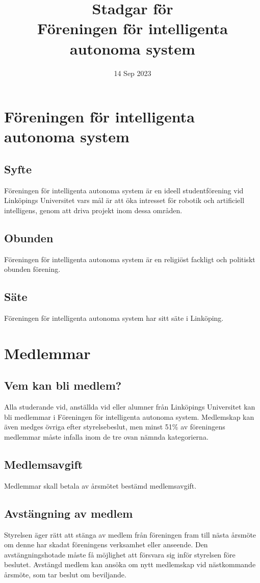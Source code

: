 \documentclass[11pt,a4paper]{article}
\title{Stadgar för\\Föreningen för intelligenta autonoma system}
\date{14 Sep 2023}
\begin{document}
\maketitle

\section{Föreningen för intelligenta autonoma system}

\subsection{Syfte}
Föreningen för intelligenta autonoma system är en ideell studentförening vid Linköpings Universitet vars mål är att öka intresset för robotik och artificiell intelligens, genom att driva projekt inom dessa områden. 
\subsection{Obunden}
Föreningen för intelligenta autonoma system är en religiöst fackligt och
politiskt obunden förening.
\subsection{Säte}
Föreningen för intelligenta autonoma system har sitt säte i Linköping.

\section{Medlemmar}

\subsection{Vem kan bli medlem?}
Alla studerande vid, anställda vid eller alumner från Linköpings Universitet kan bli medlemmar i Föreningen för intelligenta autonoma system. Medlemskap kan även medges övriga efter styrelsebeslut, men minst 51\% av föreningens medlemmar måste infalla inom de tre ovan nämnda kategorierna. 
\subsection{Medlemsavgift}
Medlemmar skall betala av årsmötet bestämd medlemsavgift.
\subsection{Avstängning av medlem}
Styrelsen äger rätt att stänga av medlem från föreningen fram till nästa årsmöte om denne har skadat föreningens verksamhet eller anseende. Den avstängningshotade måste få möjlighet att försvara sig inför styrelsen före beslutet. Avstängd medlem kan ansöka om nytt medlemskap vid nästkommande årsmöte, som tar beslut om beviljande.
\end{document}
